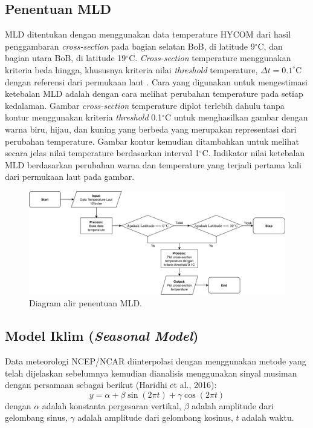 \subsection[Penentuan MLD]{Penentuan MLD}
\begin{spacing}{1.5}
	MLD ditentukan dengan menggunakan data temperature HYCOM dari hasil penggambaran \textit{cross-section} pada bagian selatan BoB, di latitude 9$^\circ$C, dan bagian utara BoB, di latitude 19$^\circ$C. \textit{Cross-section} temperature menggunakan kriteria beda hingga, khususnya kriteria nilai \textit{threshold} temperature, $\Delta t=0.1^\circ$C dengan referensi dari permukaan laut . Cara yang digunakan untuk mengestimasi ketebalan MLD adalah dengan cara melihat perubahan temperature pada setiap kedalaman. Gambar \textit{cross-section} temperature diplot terlebih dahulu tanpa kontur menggunakan kriteria \textit{threshold} 0.1$^\circ$C untuk menghasilkan gambar dengan warna biru, hijau, dan kuning yang berbeda yang merupakan representasi dari perubahan temperature. Gambar kontur kemudian ditambahkan untuk melihat secara jelas nilai temperature berdasarkan interval 1$^\circ$C. Indikator nilai ketebalan MLD berdasarkan perubahan warna dan temperature yang terjadi pertama kali dari permukaan laut pada gambar.
	
	\begin{figure}[H]
		\centering
		\includegraphics[width=14cm]{contents/Flowchart_1.png}
		\caption{Diagram alir penentuan MLD.}
		\label{fig:flowchart_1}
	\end{figure}
\subsection[Model Iklim (\textit{Seasonal Model})]{Model Iklim (\textit{Seasonal Model})}
	Data meteorologi NCEP/NCAR diinterpolasi dengan menggunakan metode yang telah dijelaskan sebelumnya kemudian dianalisis menggunakan sinyal musiman dengan persamaan sebagai berikut (Haridhi et al., 2016):
	\begin{equation}\label{eq:sm}
		y = \alpha + \beta \sin(2\pi t)+\gamma \cos(2\pi t)
	\end{equation}
	dengan $\alpha$ adalah konstanta pergesaran vertikal, $\beta$ adalah amplitude dari gelombang sinus, $\gamma$ adalah amplitude dari gelombang kosinus, $t$ adalah waktu.
	

\end{spacing}
